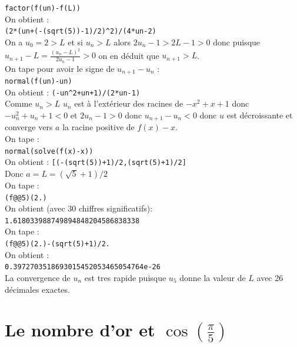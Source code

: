 \documentclass[a4paper,11pt]{book}
\begin{document}
{\tt factor(f(un)-f(L))}\\
On obtient :\\
{\tt (2*(un+(-(sqrt(5))-1)/2)\verb|^|2)/(4*un-2)}\\
On a $u_0=2>L$ et si $u_n>L$ alors $2u_n-1>2L-1>0$ donc puisque
$u_{n+1}-L=\frac{(u_n-L)^2}{2u_n-1}>0$ on en d\'eduit que $u_{n+1}>L$.\\
On tape pour avoir le signe de $u_{n+1}-u_n$ :\\
{\tt normal(f(un)-un)}\\
On obtient :
{\tt (-un\verb|^|2+un+1)/(2*un-1)}\\
Comme $u_n>L$ $u_n$ est \`a l'ext\'erieur des racines de $-x^2+x+1$ donc 
$-u_n^2+u_n+1<0$ et $2u_n-1>0$ donc $u_{n+1}-u_n<0$ donc $u$ est d\'ecroissante 
et converge vers $a$ la racine positive de $f(x)-x$.\\
On tape :\\
{\tt normal(solve(f(x)-x))}\\
On obtient :
{\tt [(-(sqrt(5))+1)/2,(sqrt(5)+1)/2]}\\
Donc $a=L=(\sqrt 5+1)/2$\\
On tape :\\
{\tt (f@@5)(2.)}\\
On obtient (avec 30 chiffres significatifs):\\
{\tt 1.618033988749894848204586838338}\\
On tape :\\
{\tt (f@@5)(2.)-(sqrt(5)+1)/2.}\\
On obtient :\\
{\tt 0.3972703518693015452053465054764e-26}\\
La  convergence de $u_n$ est tres rapide puisque $u_5$ donne la valeur de $L$ 
avec 26 d\'ecimales exactes.
\section{Le nombre d'or et $\cos(\frac{\pi}{5})$}
\end{document}
